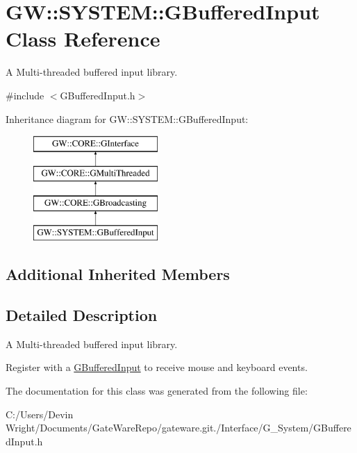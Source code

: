 \hypertarget{class_g_w_1_1_s_y_s_t_e_m_1_1_g_buffered_input}{}\section{GW\+:\+:S\+Y\+S\+T\+EM\+:\+:G\+Buffered\+Input Class Reference}
\label{class_g_w_1_1_s_y_s_t_e_m_1_1_g_buffered_input}


A Multi-\/threaded buffered input library.  




{\ttfamily \#include $<$G\+Buffered\+Input.\+h$>$}

Inheritance diagram for GW\+:\+:S\+Y\+S\+T\+EM\+:\+:G\+Buffered\+Input\+:\begin{figure}[H]
\begin{center}
\leavevmode
\includegraphics[height=4.000000cm]{class_g_w_1_1_s_y_s_t_e_m_1_1_g_buffered_input}
\end{center}
\end{figure}
\subsection*{Additional Inherited Members}


\subsection{Detailed Description}
A Multi-\/threaded buffered input library. 

Register with a \mbox{\hyperlink{class_g_w_1_1_s_y_s_t_e_m_1_1_g_buffered_input}{G\+Buffered\+Input}} to receive mouse and keyboard events. 

The documentation for this class was generated from the following file\+:\begin{DoxyCompactItemize}
\item 
C\+:/\+Users/\+Devin Wright/\+Documents/\+Gate\+Ware\+Repo/gateware.\+git./\+Interface/\+G\+\_\+\+System/G\+Buffered\+Input.\+h\end{DoxyCompactItemize}
